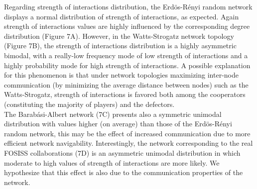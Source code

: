 \documentclass[11pt]{article}
\begin{document}
\FloatBarrier

Regarding strength of interactions distribution, the Erd\"{o}s-R\'enyi random
network displays a normal distribution of strength of interactions, as
expected. Again strength of interactions values are highly influenced by the
corresponding degree distribution (Figure 7A). However, in the Watts-Strogatz
network topology (Figure 7B), the strength of interactions distribution is a
highly asymmetric bimodal, with a really-low frequency mode of low strength of
interactions and a highly probability mode for high strength of interactions. A
possible explanation for this phenomenon is that under network topologies
maximizing inter-node communication (by minimizing the average distance between
nodes) such as the Watts-Strogatz, strength of interactions is favored both
among the cooperators (constituting the majority of players) and the
defectors. \\ 


The Barab\'asi-Albert network (7C) presents also a symmetric unimodal
distribution with values higher (on average) than those of the Erd\"{o}s-R\'enyi
random network, this may be the effect of increased communication due to more
efficient network navigability. Interestingly, the network corresponding to the
real FOSISS collaborations (7D) is an asymmetric unimodal distribution in which
moderate to high values of strength of interactions are more likely. We 
hypothesize that this effect is also due to the communication properties of the
network. 
\end{document}
